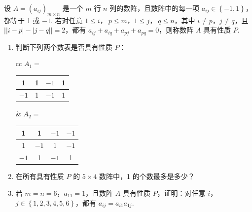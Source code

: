 \documentclass[UTF8,a4paper,oneside,11pt]{ctexbook}
\begin{document}
\begin{problem}
设 \( A=\left( a_{ij} \right)_{m\times n} \) 是一个 \( m \) 行 \( n \) 列的数阵，且数阵中的每一项 \( a_{ij}\in \left\{ -1,1 \right\} \)，都等于 1 或 \(-1\). 若对任意 \(1\le i\)，\(\ p\le m\)，\(1\le j\)，\(\ q\le n\)，其中 \( i\neq p \)，\( j\neq q \)，且 \( \left| \left| i-p \right|-\left| j-q \right| \right|=2 \)，都有 \( a_{ij}+a_{iq}+a_{pj}+a_{pq}=0 \)，则称数阵 \(A\) 具有性质 \(P\).

\begin{enumerate}
\item 判断下列两个数表是否具有性质 \(P\)：

\begin{center}
\renewcommand{\arraystretch}{1.2}
\begin{tabular}{cc}
\(A_1=\)
\begin{tabular}{|c|c|c|c|}
\hline
1 & 1 & \(-1\) & 1 \\
\hline
\(-1\) & 1 & \(-1\) & 1 \\
\hline
\end{tabular}
&
\(A_2=\)
\begin{tabular}{|c|c|c|c|}
\hline
1 & 1 & \(-1\) & \(-1\) \\
\hline
1 & \(-1\) & 1 & \(-1\) \\
\hline
\(-1\) & 1 & \(-1\) & 1 \\
\hline
\end{tabular}
\end{tabular}
\end{center}
\item 在所有具有性质 \(P\) 的 \( 5\times 4 \) 数阵中，1 的个数最多是多少？
\item 若 \( m=n=6 \)，\( a_{11}=1 \)，且数阵 \(A\) 具有性质 \(P\)，证明：对任意 \( i \)，\( j\in \left\{ 1,2,3,4,5,6 \right\} \)，都有 \( a_{ij}=a_{i1}a_{1j} \).
\end{enumerate}
\end{problem}
\end{document}
